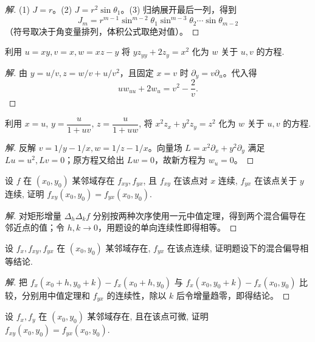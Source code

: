 \documentclass[../../数学分析培优讲义(答案版).tex]{subfiles}
\begin{document}
\begin{proof}[解]
(1) $J=r$。(2) $J=r^2\sin\theta_1$。(3) 归纳展开最后一列，得到
\[
J_m=r^{m-1}\sin^{m-2}\theta_1\sin^{m-3}\theta_2\cdots\sin\theta_{m-2}
\]
（符号取决于角变量排列，体积公式取绝对值）。
\end{proof}

\begin{example}
利用 $u=xy,v=x,w=xz-y$ 将 $yz_{yy}+2z_y=x^2$ 化为 $w$ 关于 $u,v$ 的方程.
\end{example}

\begin{proof}[解]
由 $y=u/v,z=w/v+u/v^2$，且固定 $x=v$ 时 $\partial_y=v\partial_u$。代入得
\[
u w_{uu}+2w_u=v^2-\dfrac{2}{v}.
\]
\end{proof}

\begin{example}
利用 $x=u$, $\displaystyle y=\dfrac{u}{1+uv}$, $\displaystyle z=\dfrac{u}{1+uw}$, 将 $x^2z_x+y^2z_y=z^2$ 化为 $w$ 关于 $u,v$ 的方程.
\end{example}

\begin{proof}[解]
反解 $v=1/y-1/x,w=1/z-1/x$。向量场 $L=x^2\partial_x+y^2\partial_y$ 满足 $Lu=u^2,Lv=0$；原方程又给出 $Lw=0$，故新方程为 $w_u=0$。
\end{proof}

\begin{example}
设 $f$ 在 $(x_0,y_0)$ 某邻域存在 $f_{xy},f_{yx}$, 且 $f_{xy}$ 在该点对 $x$ 连续, $f_{yx}$ 在该点关于 $y$ 连续, 证明 $f_{xy}(x_0,y_0)=f_{yx}(x_0,y_0)$.
\end{example}

\begin{proof}[解]
对矩形增量 $\Delta_h\Delta_kf$ 分别按两种次序使用一元中值定理，得到两个混合偏导在邻近点的值；令 $h,k\to0$，用题设的单向连续性即得相等。
\end{proof}

\begin{example}
设 $f_x,f_{xy},f_{yx}$ 在 $(x_0,y_0)$ 某邻域存在, $f_{yx}$ 在该点连续, 证明题设下的混合偏导相等结论.
\end{example}

\begin{proof}[解]
把 $f_x(x_0+h,y_0+k)-f_x(x_0+h,y_0)$ 与 $f_x(x_0,y_0+k)-f_x(x_0,y_0)$ 比较，分别用中值定理和 $f_{yx}$ 的连续性，除以 $k$ 后令增量趋零，即得结论。
\end{proof}

\begin{example}
设 $f_x,f_y$ 在 $(x_0,y_0)$ 某邻域存在, 且在该点可微, 证明 $f_{xy}(x_0,y_0)=f_{yx}(x_0,y_0)$.
\end{example}
\end{document}
